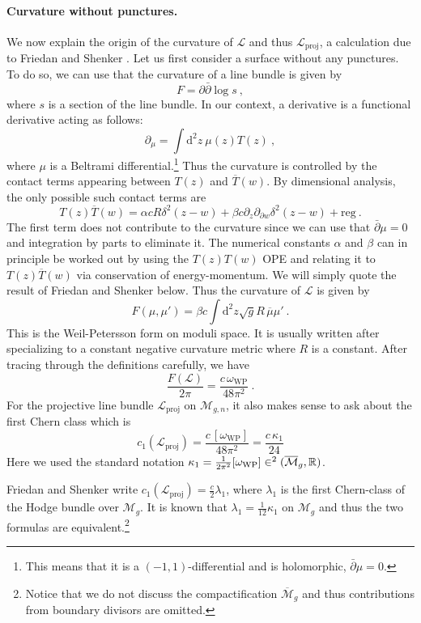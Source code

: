 \documentclass[12pt,a4paper]{article}
\newcommand{\be}{\begin{equation}}
\newcommand{\ee}{\end{equation}}
\renewcommand\d{\text{d}}
\newcommand\RR{\mathbb{R}}
\let\H\relax
\DeclareMathOperator\H{H}
\begin{document}
\paragraph{Curvature without punctures.} We now explain the origin of the curvature of $\mathscr{L}$ and thus $\mathscr{L}_\text{proj}$, a calculation due to Friedan and Shenker \cite{Friedan:1986ua}. Let us first consider a surface without any punctures.
To do so, we can use that the curvature of a line bundle is given by
\be 
F=\partial \bar{\partial} \log s\ ,
\ee
where $s$ is a section of the line bundle. In our context, a derivative is a functional derivative acting as follows:
\be 
\partial_\mu  = \int \d^2 z \  \mu(z)  T(z) \ ,
\ee
where $\mu$ is a Beltrami differential.\footnote{This means that it is a $(-1,1)$-differential and is holomorphic, $\bar{\partial} \mu=0$.} 
Thus the curvature is controlled by the contact terms appearing between $T(z)$ and $\overline{T}(w)$. By dimensional analysis, the only possible such contact terms are
\be 
T(z) \overline{T}(w)=\alpha c R \delta^2(z-w)+\beta c \partial_z \partial_{\partial w} \delta^2(z-w)+\text{reg}\ . \label{eq:TTbar contact terms}
\ee
The first term does not contribute to the curvature since we can use that $\bar{\partial} \mu=0$ and integration by parts to eliminate it. 
The numerical constants $\alpha$ and $\beta$ can in principle be worked out by using the $T(z) T(w)$ OPE and relating it to $T(z) \overline{T}(w)$ via conservation of energy-momentum. We will simply quote the result of Friedan and Shenker below.
Thus the curvature of $\mathscr{L}$ is given by
\be 
F(\mu,\mu')=\beta c \int \d^2z \sqrt{g} R\, \overline{\mu} \mu' \ .
\ee
This is the Weil-Petersson form on moduli space. It is usually written after specializing to a constant negative curvature metric where $R$ is a constant.
After tracing through the definitions carefully, we have
\be 
\frac{F(\mathscr{L})}{2\pi}=\frac{c\, \omega_\text{WP}}{48\pi^2}\ .
\ee
For the projective line bundle $\mathscr{L}_\text{proj}$ on $\mathcal{M}_{g,n}$, it also makes sense to ask about the first Chern class which is
\be 
c_1(\mathscr{L}_\text{proj})=\frac{c\, [\omega_\text{WP}]}{48\pi^2}=\frac{c\, \kappa_1}{24}
\ee
Here we used the standard notation $\kappa_1=\frac{1}{2\pi^2} [\omega_\text{WP}] \in \H^2(\overline{\mathcal{M}}_g,\RR)$.

Friedan and Shenker write $c_1(\mathscr{L}_\text{proj})=\frac{c}{2} \lambda_1$, where $\lambda_1$ is the first Chern-class of the Hodge bundle over $\mathcal{M}_{g}$. It is known that $\lambda_1=\frac{1}{12}\kappa_1$ on $\mathcal{M}_g$ and thus the two formulas are equivalent.\footnote{Notice that we do not discuss the compactification $\overline{\mathcal{M}}_{g}$ and thus contributions from boundary divisors are omitted.}
\end{document}
